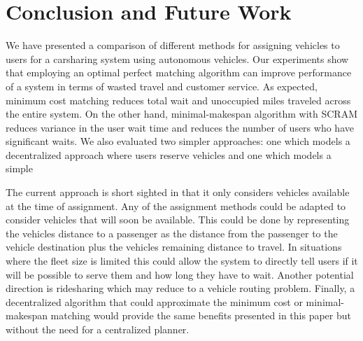 \documentclass[letterpaper]{article}
\begin{document}
\section{Conclusion and Future Work}

We have presented a comparison of different methods for assigning vehicles to users for a carsharing system using autonomous vehicles. Our experiments show that employing an optimal perfect matching algorithm can improve performance of a system in terms of wasted travel and customer service. As expected, minimum cost matching reduces total wait and unoccupied miles traveled across the entire system. On the other hand, minimal-makespan algorithm with SCRAM reduces variance in the user wait time and reduces the number of users who have significant waits. We also evaluated two simpler approaches: one which models a decentralized approach where users reserve vehicles and one which models a simple

The current approach is short sighted in that it only considers vehicles available at the time of assignment. Any of the assignment methods could be adapted to consider vehicles that will soon be available. This could be done by representing the vehicles distance to a passenger as the distance from the passenger to the vehicle destination plus the vehicles remaining distance to travel. In situations where the fleet size is limited this could allow the system to directly tell users if it will be possible to serve them and how long they have to wait. Another potential direction is ridesharing which may reduce to a vehicle routing problem. Finally, a decentralized algorithm that could approximate the minimum cost or minimal-makespan matching would provide the same benefits presented in this paper but without the need for a centralized planner.



\end{document}
